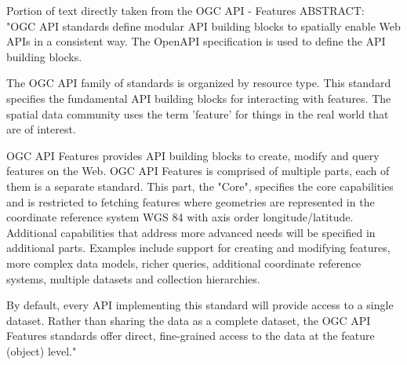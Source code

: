 Portion of text directly taken from the OGC API - Features ABSTRACT:  \cite{OGCApiFeatures}\\
\newline
"OGC API standards define modular API building blocks to spatially enable Web APIs in a consistent way. The OpenAPI specification is used to define the API building blocks.

The OGC API family of standards is organized by resource type. This standard specifies the fundamental API building blocks for interacting with features. The spatial data community uses the term 'feature' for things in the real world that are of interest.

OGC API Features provides API building blocks to create, modify and query features on the Web. OGC API Features is comprised of multiple parts, each of them is a separate standard. This part, the "Core", specifies the core capabilities and is restricted to fetching features where geometries are represented in the coordinate reference system WGS 84 with axis order longitude/latitude. Additional capabilities that address more advanced needs will be specified in additional parts. Examples include support for creating and modifying features, more complex data models, richer queries, additional coordinate reference systems, multiple datasets and collection hierarchies.

By default, every API implementing this standard will provide access to a single dataset. Rather than sharing the data as a complete dataset, the OGC API Features standards offer direct, fine-grained access to the data at the feature (object) level." \cite{OGCApiFeatures}